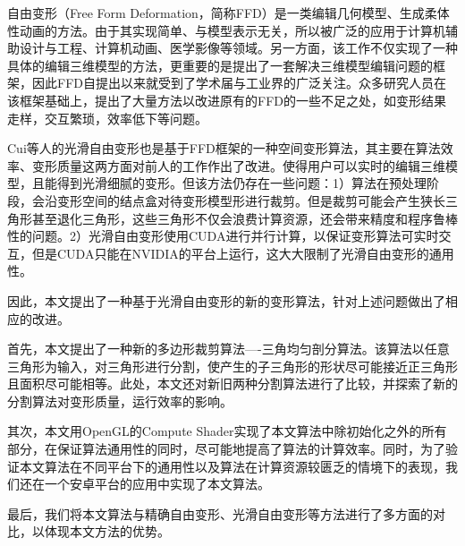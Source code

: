 
\begin{cabstract}
    自由变形\cite{Sederberg86}（Free Form Deformation，简称FFD）是一类编辑几何模型、生成柔体性动画的方法。由于其实现简单、与模型表示无关，所以被广泛的应用于计算机辅助设计与工程、计算机动画、医学影像等领域。另一方面，该工作不仅实现了一种具体的编辑三维模型的方法，更重要的是提出了一套解决三维模型编辑问题的框架，因此FFD\cite{Sederberg86}自提出以来就受到了学术届与工业界的广泛关注。众多研究人员在该框架基础上，提出了大量方法以改进原有的FFD的一些不足之处，如变形结果走样，交互繁琐，效率低下等问题。

    Cui等人的光滑自由变形\cite{Cui15}也是基于FFD框架的一种空间变形算法，其主要在算法效率、变形质量这两方面对前人的工作作出了改进。使得用户可以实时的编辑三维模型，且能得到光滑细腻的变形。但该方法仍存在一些问题：1）算法在预处理阶段，会沿变形空间的结点盒对待变形模型形进行裁剪。但是裁剪可能会产生狭长三角形甚至退化三角形，这些三角形不仅会浪费计算资源，还会带来精度和程序鲁棒性的问题。2）光滑自由变形使用CUDA进行并行计算，以保证变形算法可实时交互，但是CUDA只能在NVIDIA的平台上运行，这大大限制了光滑自由变形的通用性。

    因此，本文提出了一种基于光滑自由变形的新的变形算法，针对上述问题做出了相应的改进。

    首先，本文提出了一种新的多边形裁剪算法----三角均匀剖分算法。该算法以任意三角形为输入，对三角形进行分割，使产生的子三角形的形状尽可能接近正三角形且面积尽可能相等。此处，本文还对新旧两种分割算法进行了比较，并探索了新的分割算法对变形质量，运行效率的影响。

    其次，本文用OpenGL的Compute Shader实现了本文算法中除初始化之外的所有部分，在保证算法通用性的同时，尽可能地提高了算法的计算效率。同时，为了验证本文算法在不同平台下的通用性以及算法在计算资源较匮乏的情境下的表现，我们还在一个安卓平台的应用中实现了本文算法。

    最后，我们将本文算法与精确自由变形、光滑自由变形等方法进行了多方面的对比，以体现本文方法的优势。
\end{cabstract}

